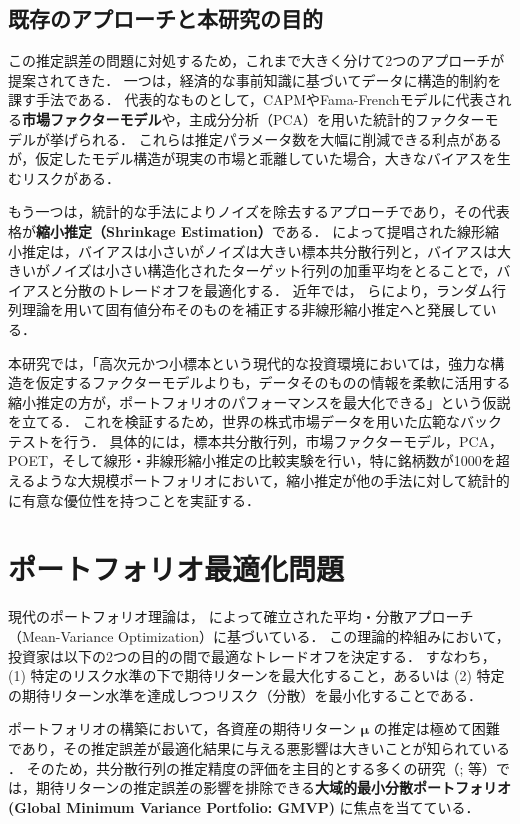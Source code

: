\documentclass[lualatex,a4paper,11pt]{jlreq}
\begin{document}
\subsection{既存のアプローチと本研究の目的}
この推定誤差の問題に対処するため，これまで大きく分けて2つのアプローチが提案されてきた．
一つは，経済的な事前知識に基づいてデータに構造的制約を課す手法である．
代表的なものとして，CAPMやFama-Frenchモデルに代表される\textbf{市場ファクターモデル}や，主成分分析（PCA）を用いた統計的ファクターモデルが挙げられる．
これらは推定パラメータ数を大幅に削減できる利点があるが，仮定したモデル構造が現実の市場と乖離していた場合，大きなバイアスを生むリスクがある．

もう一つは，統計的な手法によりノイズを除去するアプローチであり，その代表格が\textbf{縮小推定（Shrinkage Estimation）}である．
\citet{LedoitWolf2004} によって提唱された線形縮小推定は，バイアスは小さいがノイズは大きい標本共分散行列と，バイアスは大きいがノイズは小さい構造化されたターゲット行列の加重平均をとることで，バイアスと分散のトレードオフを最適化する．
近年では，\citet{DeNard2022} らにより，ランダム行列理論を用いて固有値分布そのものを補正する非線形縮小推定へと発展している．

本研究では，「高次元かつ小標本という現代的な投資環境においては，強力な構造を仮定するファクターモデルよりも，データそのものの情報を柔軟に活用する縮小推定の方が，ポートフォリオのパフォーマンスを最大化できる」という仮説を立てる．
これを検証するため，世界の株式市場データを用いた広範なバックテストを行う．
具体的には，標本共分散行列，市場ファクターモデル，PCA，POET，そして線形・非線形縮小推定の比較実験を行い，特に銘柄数が1000を超えるような大規模ポートフォリオにおいて，縮小推定が他の手法に対して統計的に有意な優位性を持つことを実証する．

\section{ポートフォリオ最適化問題}

現代のポートフォリオ理論は，\citet{Markowitz1952} によって確立された平均・分散アプローチ（Mean-Variance Optimization）に基づいている．
この理論的枠組みにおいて，投資家は以下の2つの目的の間で最適なトレードオフを決定する．
すなわち，(1) 特定のリスク水準の下で期待リターンを最大化すること，あるいは (2) 特定の期待リターン水準を達成しつつリスク（分散）を最小化することである．

ポートフォリオの構築において，各資産の期待リターン $\symbf{\mu}$ の推定は極めて困難であり，その推定誤差が最適化結果に与える悪影響は大きいことが知られている \citep{Merton1980}．
そのため，共分散行列の推定精度の評価を主目的とする多くの研究（\citealp{LedoitWolf2004}; \citealp{DeNard2022} 等）では，期待リターンの推定誤差の影響を排除できる\textbf{大域的最小分散ポートフォリオ (Global Minimum Variance Portfolio: GMVP)} に焦点を当てている．
\end{document}
